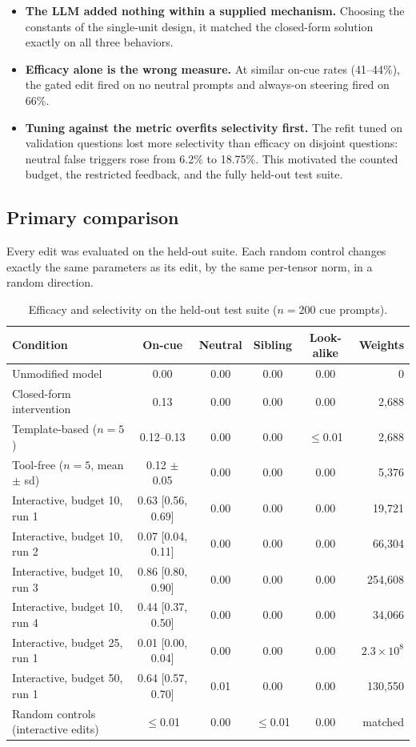 \documentclass{article}
\begin{document}
\begin{itemize}
\item \textbf{The LLM added nothing within a supplied mechanism.} Choosing the constants of the single-unit design, it matched the closed-form solution exactly on all three behaviors.
\item \textbf{Efficacy alone is the wrong measure.} At similar on-cue rates (41--44\%), the gated edit fired on no neutral prompts and always-on steering fired on 66\%.
\item \textbf{Tuning against the metric overfits selectivity first.} The refit tuned on validation questions lost more selectivity than efficacy on disjoint questions: neutral false triggers rose from 6.2\% to 18.75\%. This motivated the counted budget, the restricted feedback, and the fully held-out test suite.
\end{itemize}

\subsection{Primary comparison}\label{sec:primary}
Every edit was evaluated on the held-out suite. Each random control changes exactly the same parameters as its edit, by the same per-tensor norm, in a random direction.

\begin{table}[h]\centering\small
\caption{Efficacy and selectivity on the held-out test suite ($n=200$ cue prompts).}
\label{tab:primary}
\begin{tabular}{@{}lccccr@{}}\toprule
Condition & On-cue & Neutral & Sibling & Look-alike & Weights\\\midrule
Unmodified model & 0.00 & 0.00 & 0.00 & 0.00 & 0\\
Closed-form intervention & 0.13 & 0.00 & 0.00 & 0.00 & 2{,}688\\
Template-based ($n=5$) & 0.12--0.13 & 0.00 & 0.00 & $\le$0.01 & 2{,}688\\
Tool-free ($n=5$, mean $\pm$ sd) & 0.12 $\pm$ 0.05 & 0.00 & 0.00 & 0.00 & 5{,}376\\\midrule
Interactive, budget 10, run 1 & 0.63 [0.56, 0.69] & 0.00 & 0.00 & 0.00 & 19{,}721\\
Interactive, budget 10, run 2 & 0.07 [0.04, 0.11] & 0.00 & 0.00 & 0.00 & 66{,}304\\
Interactive, budget 10, run 3 & 0.86 [0.80, 0.90] & 0.00 & 0.00 & 0.00 & 254{,}608\\
Interactive, budget 10, run 4 & 0.44 [0.37, 0.50] & 0.00 & 0.00 & 0.00 & 34{,}066\\
Interactive, budget 25, run 1 & 0.01 [0.00, 0.04] & 0.00 & 0.00 & 0.00 & $2.3\times10^{8}$\\
Interactive, budget 50, run 1 & 0.64 [0.57, 0.70] & 0.01 & 0.00 & 0.00 & 130{,}550\\\midrule
Random controls (interactive edits) & $\le$0.01 & 0.00 & $\le$0.01 & 0.00 & matched\\
\bottomrule\end{tabular}\end{table}
\end{document}
